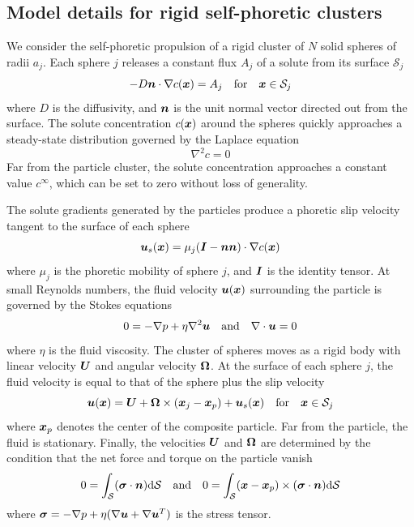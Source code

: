 \begin{appendices}
\section{Model details for rigid self-phoretic clusters}

We consider the self-phoretic propulsion of a rigid cluster of $N$ solid spheres of radii $a_j$. Each sphere $j$ releases a constant flux $A_j$ of a solute from its surface $\mathcal{S}_j$  
\begin{equation}
    -D \boldsymbol{n}\cdot \nabla c(\boldsymbol{x}) = A_j \quad \text{for} \quad \boldsymbol{x} \in \mathcal{S}_j \label{eq:bc1}
\end{equation}
where $D$ is the diffusivity, and $\boldsymbol{n}$ is the unit normal vector directed out from the surface.  The solute concentration $c(\boldsymbol{x})$ around the spheres quickly approaches a steady-state distribution governed by the Laplace equation
\begin{equation}
    \nabla^2 c = 0
\end{equation}
Far from the particle cluster, the solute concentration approaches a constant value $c^{\infty}$, which can be set to zero without loss of generality. 

The solute gradients generated by the particles produce a phoretic slip velocity tangent to the surface of each sphere 
\begin{equation}
    \boldsymbol{u}_s(\boldsymbol{x}) = \mu_j (\boldsymbol{I}-\boldsymbol{n}\boldsymbol{n}) \cdot \nabla c(\boldsymbol{x}) 
\end{equation}
where $\mu_j$ is the phoretic mobility of sphere $j$, and $\boldsymbol{I}$ is the identity tensor. At small Reynolds numbers, the fluid velocity $\boldsymbol{u}(\boldsymbol{x})$ surrounding the particle is governed by the Stokes equations
\begin{equation}
    0 = -\nabla p + \eta \nabla^2 \boldsymbol{u} \quad \text{and}\quad \nabla\cdot\boldsymbol{u} = 0
\end{equation}
where $\eta$ is the fluid viscosity.  The cluster of spheres moves as a rigid body with linear velocity $\boldsymbol{U}$ and angular velocity $\boldsymbol{\Omega}$.  At the surface of each sphere $j$, the fluid velocity is equal to that of the sphere plus the slip velocity  
\begin{equation}
    \boldsymbol{u}(\boldsymbol{x}) = \boldsymbol{U} + \boldsymbol{\Omega}\times(\boldsymbol{x}_j - \boldsymbol{x}_p) + \boldsymbol{u}_s(\boldsymbol{x}) \quad \text{for} \quad \boldsymbol{x} \in \mathcal{S}_j
\end{equation}
where $\boldsymbol{x}_p$ denotes the center of the composite particle.  Far from the particle, the fluid is stationary.  Finally, the velocities $\boldsymbol{U}$ and $\boldsymbol{\Omega}$ are determined by the condition that the net force and torque on the particle vanish
\begin{equation}
    0 = \int_{\mathcal{S}} (\boldsymbol{\sigma}\cdot\boldsymbol{n}) \mathrm{d}\mathcal{S}  \quad \text{and} \quad 0 = \int_{\mathcal{S}} (\boldsymbol{x}-\boldsymbol{x}_p)\times (\boldsymbol{\sigma}\cdot\boldsymbol{n} )\mathrm{d}\mathcal{S}  \label{eq:noForceTorque}
\end{equation}
where $\boldsymbol{\sigma} = -\nabla p + \eta(\nabla\boldsymbol{u}+\nabla\boldsymbol{u}^T)$ is the stress tensor.


\end{appendices}
